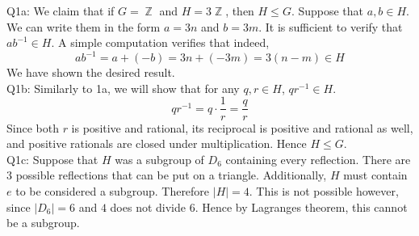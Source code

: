 \documentclass[letterpaper]{article}
\DeclareMathOperator{\Z}{\mathbb{Z}}
\begin{document}
\noindent
Q1a: We claim that if $G = \Z$ and $H = 3\Z$, then $H \leq G$. Suppose that $a,b \in H$. We can write them in the form $a = 3n$ and $b = 3m$. It is sufficient to verify that $ab^{-1}\in H$. A simple computation verifies that indeed, $$ab^{-1} = a + (-b) = 3n + (-3m) = 3(n-m) \in H$$
We have shown the desired result. 
\newline \\ \noindent 
Q1b: Similarly to 1a, we will show that for any $q,r\in H$, $qr^{-1} \in H$. $$qr^{-1} = q \cdot \frac{1}{r} = \frac{q}{r}$$
Since both $r$ is positive and rational, its reciprocal is positive and rational as well, and positive rationals are closed under multiplication. Hence $H \leq G $. 
\newline \\ \noindent Q1c: Suppose that $H$ was a subgroup of $D_{6}$ containing every reflection. There are 3 possible reflections that can be put on a triangle. Additionally, $H$ must contain $e$ to be considered a subgroup. Therefore $|H| =4$. This is not possible however, since $|D_{6}| = 6$ and $4$ does not divide $6$. Hence by Lagranges theorem, this cannot be a subgroup. 
\end{document}

